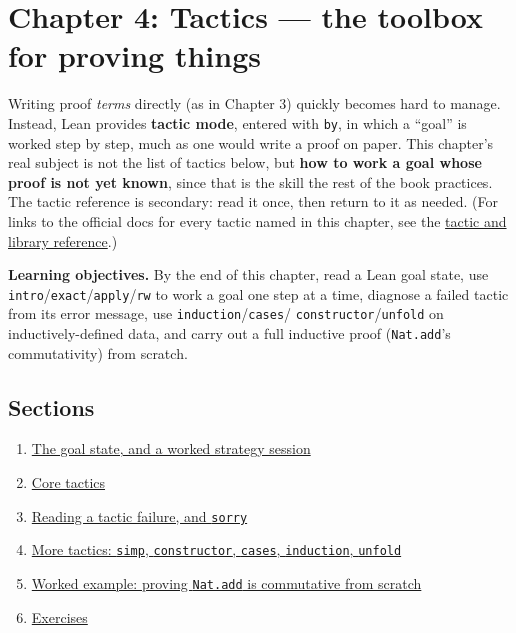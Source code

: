 \chapter{Chapter 4: Tactics --- the toolbox for proving things}\label{sec:04-tactics:00-index:1}

Writing proof \emph{terms} directly (as in Chapter 3) quickly becomes hard to manage. Instead, Lean provides \textbf{tactic mode}, entered with \texttt{by}, in which a ``goal'' is worked step by step, much as one would write a proof on paper. This chapter's real subject is not the list of tactics below, but \textbf{how to work a goal whose proof is not yet known}, since that is the skill the rest of the book practices. The tactic reference is secondary: read it once, then return to it as needed. (For links to the official docs for every tactic named in this chapter, see the \hyperref[sec:root:tactic-and-library-reference:1]{tactic and library reference}.)

\textbf{Learning objectives.} By the end of this chapter, read a Lean goal state, use \texttt{intro}/\texttt{exact}/\texttt{apply}/\texttt{rw} to work a goal one step at a time, diagnose a failed tactic from its error message, use \texttt{induction}/\texttt{cases}/ \texttt{constructor}/\texttt{unfold} on inductively-defined data, and carry out a full inductive proof (\texttt{Nat.add}'s commutativity) from scratch.

\section{Sections}\label{sec:04-tactics:00-index:2}

\begin{enumerate}
\def\labelenumi{\arabic{enumi}.}
\tightlist
\item
  \hyperref[sec:04-tactics:01-goal-state:1]{The goal state, and a worked strategy session}
\item
  \hyperref[sec:04-tactics:02-core-tactics:1]{Core tactics}
\item
  \hyperref[sec:04-tactics:03-reading-failures:1]{Reading a tactic failure, and \texttt{sorry}}
\item
  \hyperref[sec:04-tactics:04-more-tactics:1]{More tactics: \texttt{simp}, \texttt{constructor}, \texttt{cases}, \texttt{induction}, \texttt{unfold}}
\item
  \hyperref[sec:04-tactics:05-worked-example:1]{Worked example: proving \texttt{Nat.add} is commutative from scratch}
\item
  \hyperref[sec:04-tactics:06-exercises:1]{Exercises}
\end{enumerate}







